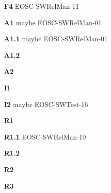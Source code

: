 \textbf{F4} EOSC-SWRelMan-11


\textbf{A1} maybe EOSC-SWRelMan-01

\textbf{A1.1} maybe EOSC-SWRelMan-01

\textbf{A1.2}

\textbf{A2}

\textbf{I1}

\textbf{I2} maybe EOSC-SWTest-16

\textbf{R1}

\textbf{R1.1} EOSC-SWRelMan-10

\textbf{R1.2}

\textbf{R2}

\textbf{R3}


